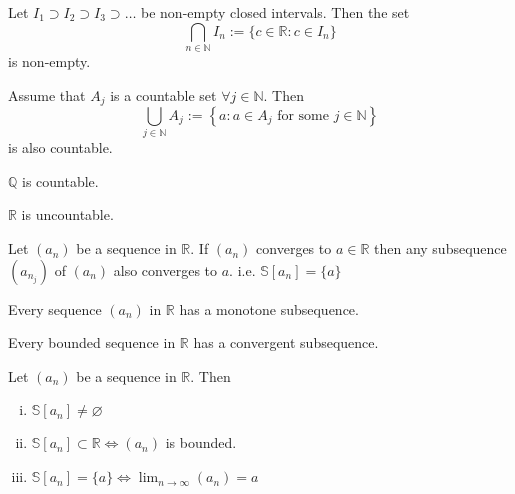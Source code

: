 \documentclass{report}
\theoremstyle{definition}
\begin{document}
\begin{seqt}
    Let $I_1 \supset I_2 \supset I_3 \supset \dots$ be non-empty closed intervals. Then the set
    \[\bigcap_{n\in\mathbb{N}} I_n := \{c\in\mathbb{R}:c\in I_n\} \]
    is non-empty.
\end{seqt}

\begin{seql}
    Assume that $A_j$ is a countable set $\forall j\in\mathbb{N}$. Then
    \[\bigcup_{j\in\mathbb{N}} A_j := \left\{ a: a\in A_j \text{ for some } j\in\mathbb{N} \right\}\]
    is also countable.
\end{seql}

\begin{seqt}
    $\mathbb{Q}$ is countable.
\end{seqt}

\begin{seqt}
    $\mathbb{R}$ is uncountable.
\end{seqt}

\begin{seql}
    Let $(a_n)$ be a sequence in $\mathbb{R}$. If $(a_n)$ converges to $a\in\mathbb{R}$ then any subsequence $(a_{n_j})$ of $(a_n)$
    also converges to $a$. i.e. $\mathbb{S}[a_n] = \{a\}$
\end{seql}

\begin{seql}
    Every sequence $(a_n)$ in $\mathbb{R}$ has a monotone subsequence.
\end{seql}

\begin{seqt}
    Every bounded sequence in $\mathbb{R}$ has a convergent subsequence.
\end{seqt}

\begin{seql}
    Let $(a_n)$ be a sequence in $\mathbb{R}$. Then
    \begin{enumerate}[(i)]
        \item  $\mathbb{S}[a_n]\neq\varnothing$
        \item $\mathbb{S}[a_n] \subset \mathbb{R}\iff (a_n)$ is bounded.
        \item $\mathbb{S}[a_n] = \{a\}\iff\lim_{n\to\infty}(a_n)=a$
    \end{enumerate}
\end{seql}
\end{document}

